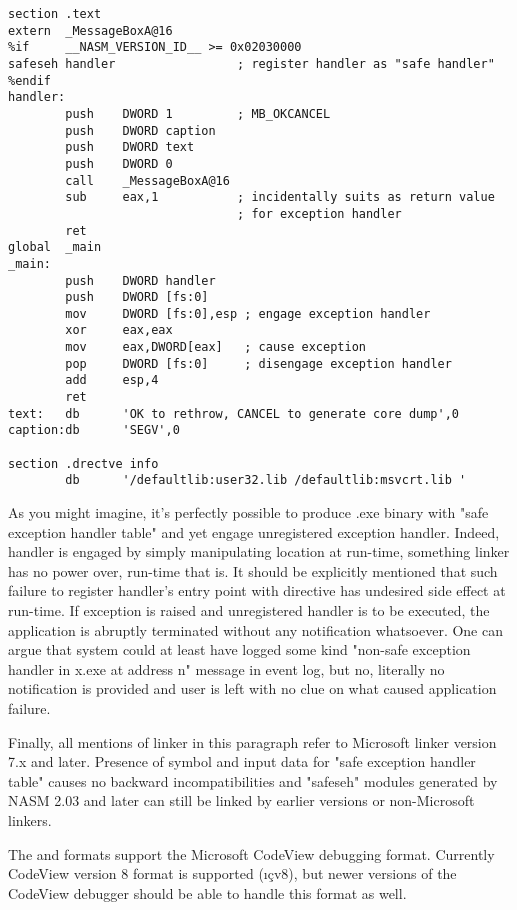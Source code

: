 \begin{lstlisting}
section .text
extern  _MessageBoxA@16
%if     __NASM_VERSION_ID__ >= 0x02030000
safeseh handler                 ; register handler as "safe handler"
%endif
handler:
        push    DWORD 1         ; MB_OKCANCEL
        push    DWORD caption
        push    DWORD text
        push    DWORD 0
        call    _MessageBoxA@16
        sub     eax,1           ; incidentally suits as return value
                                ; for exception handler
        ret
global  _main
_main:
        push    DWORD handler
        push    DWORD [fs:0]
        mov     DWORD [fs:0],esp ; engage exception handler
        xor     eax,eax
        mov     eax,DWORD[eax]   ; cause exception
        pop     DWORD [fs:0]     ; disengage exception handler
        add     esp,4
        ret
text:   db      'OK to rethrow, CANCEL to generate core dump',0
caption:db      'SEGV',0

section .drectve info
        db      '/defaultlib:user32.lib /defaultlib:msvcrt.lib '
\end{lstlisting}

As you might imagine, it's perfectly possible to produce .exe binary
with "safe exception handler table" and yet engage unregistered
exception handler. Indeed, handler is engaged by simply manipulating
\code{[fs:0]} location at run-time, something linker has no power over,
run-time that is. It should be explicitly mentioned that such failure
to register handler's entry point with  directive has
undesired side effect at run-time. If exception is raised and
unregistered handler is to be executed, the application is abruptly
terminated without any notification whatsoever. One can argue that
system could  at least have logged some kind "non-safe exception
handler in x.exe at address n" message in event log, but no, literally
no notification is provided and user is left with no clue on what
caused application failure.

Finally, all mentions of linker in this paragraph refer to Microsoft
linker version 7.x and later. Presence of  symbol and input
data for "safe exception handler table" causes no backward
incompatibilities and "safeseh" modules generated by NASM 2.03 and
later can still be linked by earlier versions or non-Microsoft linkers.


The  and  formats support the Microsoft CodeView
debugging format. Currently CodeView version 8 format is supported
(\i\c{cv8}), but newer versions of the CodeView debugger should be
able to handle this format as well.


